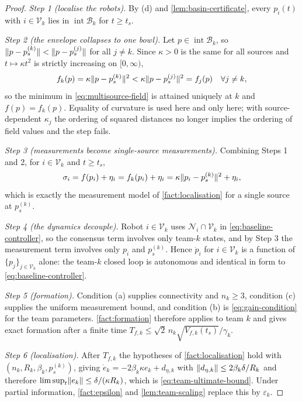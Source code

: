 \documentclass[11pt,a4paper]{article}
\theoremstyle{plain}
\theoremstyle{definition}
\newcommand{\V}{\mathcal{V}}
\DeclarePairedDelimiter{\norm}{\lVert}{\rVert}
\begin{document}
\begin{proof}
\emph{Step 1 (localise the robots).} By (d) and \cref{lem:basin-certificate}, every
$p_i(t)$ with $i\in\V_k$ lies in $\operatorname{int}\mathcal{B}_k$ for $t\geq t_s$.

\emph{Step 2 (the envelope collapses to one bowl).} Let $p\in\operatorname{int}\mathcal{B}_k$, so
$\norm{p-p_s^{(k)}}<\norm{p-p_s^{(j)}}$ for all $j\neq k$. Since $\kappa>0$ is the same for all
sources and $t\mapsto\kappa t^2$ is strictly increasing on $[0,\infty)$,
\begin{equation*}
    f_k(p)=\kappa\norm{p-p_s^{(k)}}^2<\kappa\norm{p-p_s^{(j)}}^2=f_j(p)
    \quad\forall j\neq k,
\end{equation*}
so the minimum in \eqref{eq:multisource-field} is attained uniquely at $k$ and
$f(p)=f_k(p)$. Equality of curvature is used here and only here; with source-dependent
$\kappa_j$ the ordering of squared distances no longer implies the ordering of field values and
the step fails.

\emph{Step 3 (measurements become single-source measurements).} Combining Steps 1 and 2, for
$i\in\V_k$ and $t\geq t_s$,
\begin{equation*}
    \sigma_i=f(p_i)+\eta_i=f_k(p_i)+\eta_i=\kappa\norm{p_i-p_s^{(k)}}^2+\eta_i,
\end{equation*}
which is exactly the measurement model of \cref{fact:localisation} for a single source at
$p_s^{(k)}$.

\emph{Step 4 (the dynamics decouple).} Robot $i\in\V_k$ uses
$\mathcal{N}_i\cap\V_k$ in \eqref{eq:baseline-controller}, so the consensus term involves only
team-$k$ states, and by Step 3 the measurement term involves only $p_i$ and $p_s^{(k)}$. Hence
$\dot p_i$ for $i\in\V_k$ is a function of $\{p_j\}_{j\in\V_k}$ alone: the team-$k$ closed loop
is autonomous and identical in form to \eqref{eq:baseline-controller}.

\emph{Step 5 (formation).} Condition (a) supplies connectivity and $n_k\geq3$, condition (c)
supplies the uniform measurement bound, and condition (b) is \eqref{eq:gain-condition} for the
team parameters. \cref{fact:formation} therefore applies to team $k$ and gives exact formation
after a finite time $T_{f,k}\leq\sqrt2\,n_k\sqrt{V_{f,k}(t_s)}/\gamma_k$.

\emph{Step 6 (localisation).} After $T_{f,k}$ the hypotheses of \cref{fact:localisation} hold
with $(n_k,R_k,\beta_k,p_s^{(k)})$, giving
$\dot e_k=-2\beta_k\kappa e_k+d_{\eta,k}$ with
$\norm{d_{\eta,k}}\leq2\beta_k\delta/R_k$ and therefore
$\limsup_t\norm{e_k}\leq\delta/(\kappa R_k)$, which is \eqref{eq:team-ultimate-bound}. Under
partial information, \cref{fact:epsilon} and \cref{lem:team-scaling} replace this by
$\varepsilon_k$.
\end{proof}
\end{document}
